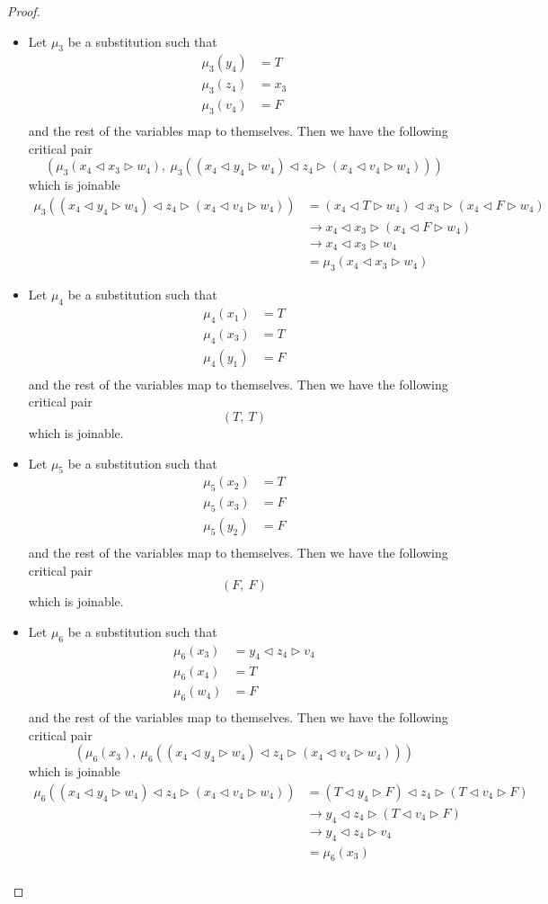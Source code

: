 \documentclass[a4paper,twoside,openright]{report}
\newcommand{\lef}{\ensuremath{\triangleleft}}
\newcommand{\rig}{\ensuremath{\triangleright}}
\begin{document}
\begin{proof}
\begin{itemize}
\item Let $\mu_3$ be a substitution such that
\begin{align*}
\mu_3(y_4) &= T\\
\mu_3(z_4) &= x_3\\
\mu_3(v_4) &= F\\
\end{align*}
and the rest of the variables map to themselves. Then we have the following critical pair
\[
(\mu_3(x_4\lef x_3\rig w_4),~ \mu_3((x_4\lef y_4\rig w_4)\lef z_4\rig(x_4\lef v_4\rig w_4)))
\]
which is joinable
\begin{align*}
\mu_3((x_4\lef y_4\rig w_4)\lef z_4\rig(x_4\lef v_4\rig w_4))
&=(x_4\lef T\rig w_4)\lef x_3\rig (x_4\lef F\rig w_4)\\
&\to x_4\lef x_3\rig (x_4\lef F\rig w_4)\\
&\to x_4\lef x_3\rig w_4\\
&= \mu_3(x_4\lef x_3\rig w_4)
\end{align*}

\item Let $\mu_4$ be a substitution such that
\begin{align*}
\mu_4(x_1) &= T\\
\mu_4(x_3) &= T\\
\mu_4(y_1) &= F\\
\end{align*}
and the rest of the variables map to themselves. Then we have the following critical pair
\[
(T,~T)
\]
which is joinable.

\item Let $\mu_5$ be a substitution such that
\begin{align*}
\mu_5(x_2) &= T\\
\mu_5(x_3) &= F\\
\mu_5(y_2) &= F\\
\end{align*}
and the rest of the variables map to themselves. Then we have the following critical pair
\[
(F,~F)
\]
which is joinable.

\item Let $\mu_6$ be a substitution such that
\begin{align*}
\mu_6(x_3) &= y_4\lef z_4\rig v_4\\
\mu_6(x_4) &= T\\
\mu_6(w_4) &= F\\
\end{align*}
and the rest of the variables map to themselves. Then we have the following critical pair
\[
(\mu_6(x_3),~\mu_6((x_4\lef y_4\rig w_4)\lef z_4\rig(x_4\lef v_4\rig w_4)))
\]
which is joinable
\begin{align*}
\mu_6((x_4\lef y_4\rig w_4)\lef z_4\rig(x_4\lef v_4\rig w_4))
&=(T\lef y_4\rig F)\lef z_4\rig(T\lef v_4\rig F)\\
&\to y_4\lef z_4\rig(T\lef v_4\rig F)\\
&\to y_4\lef z_4\rig v_4\\
&=\mu_6(x_3)\\
\end{align*}


\end{itemize}
\end{proof}
\end{document}
